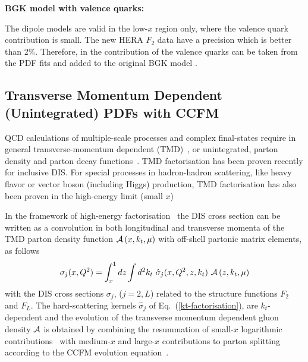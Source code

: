 \begin{description}
\vspace{0.1cm}
\item \bf {BGK model with valence quarks:} \rm

The dipole models are valid in the low-$x$ region only, where the valence quark contribution is small.
The new HERA $F_2$ data have a precision which is  better than 2$\%$. Therefore, in \fitter the contribution of the valence quarks can be taken from the PDF fits and added to the original 
BGK model \cite{Belov,Luszczak:2013rxa}.
\end{description}

\subsection{Transverse Momentum Dependent (Unintegrated) PDFs with CCFM}


\def\kt{\ensuremath{k_t}}
\def\pt{\ensuremath{p_t}}


QCD calculations of multiple-scale processes  and complex final-states
require in general transverse-momentum dependent (TMD)~\cite{Collins:2011zzd}, or 
unintegrated, parton  density and parton decay 
functions~\cite{Aybat:2011zv,Buffing:2013eka,Buffing:2013kca,Buffing:2012sz,Mulders:2008tf,Jadach:2009gm,Hautmann:2009zzb,Hautmann:2012pf,Hautmann:2007gw}.   
TMD factorisation has been proven recently \cite{Collins:2011zzd} for inclusive DIS. For special
processes in hadron-hadron scattering, like heavy flavor or vector boson (including Higgs) production, 
TMD factorisation has also been proven in the high-energy limit (small $x$) \cite{Catani:1990xk,Collins:1991ty,Hautmann:2010be}
  
In the framework of high-energy factorisation~\cite{Catani:1990xk,Catani:1990eg,Catani:1993ww} 
the DIS cross section can be written as a convolution in 
both longitudinal and transverse momenta of the TMD parton density function 
${\cal A}\left(x,\kt,\mu\right)$    
 with  off-shell partonic matrix elements, as follows 
\begin{equation}
 \sigma_j (x, Q^2) = \int_x^1  
d z \int d^2k_t \ 
\hat{\sigma}_j(x,Q^2,{z},k_t) \ 
 {\cal  A}\left( {z} ,\kt, \mu \right) 
\label{kt-factorisation}
\end{equation}
with the DIS cross sections 
$\sigma_j$, ($j= 2 , L$) related to the  structure functions $F_2$ and $F_L$.
The hard-scattering kernels ${\hat \sigma}_j$ of Eq.~(\ref{kt-factorisation}),    
are $k_t$-dependent and the evolution  of the 
transverse momentum dependent gluon density 
${\cal A} $ is obtained by combining the resummation of small-$x$ logarithmic 
contributions~\cite{Lipatov:1996ts,Fadin:1975cb,Balitsky:1978ic} with medium-$x$ and large-$x$ 
contributions to parton  splitting~\cite{Gribov:1972ri,Altarelli:1977zs,Dokshitzer:1977sg} according to the 
CCFM evolution equation~\cite{Ciafaloni:1987ur,Catani:1989sg,Marchesini:1994wr}.
  
